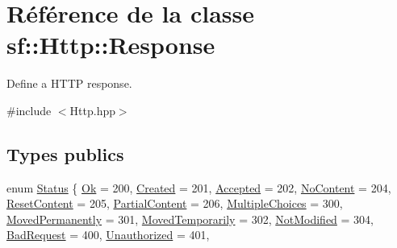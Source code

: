 \hypertarget{classsf_1_1Http_1_1Response}{}\section{Référence de la classe sf\+:\+:Http\+:\+:Response}
\label{classsf_1_1Http_1_1Response}


Define a H\+T\+TP response.  




{\ttfamily \#include $<$Http.\+hpp$>$}

\subsection*{Types publics}
\begin{DoxyCompactItemize}
\item 
enum \hyperlink{classsf_1_1Http_1_1Response_a663e071978e30fbbeb20ed045be874d8}{Status} \{ \newline
\hyperlink{classsf_1_1Http_1_1Response_a663e071978e30fbbeb20ed045be874d8a0158f932254d3f09647dd1f64bd43832}{Ok} = 200, 
\hyperlink{classsf_1_1Http_1_1Response_a663e071978e30fbbeb20ed045be874d8a0a6e8bafa9365a0ed10b8a9cbfd0649b}{Created} = 201, 
\hyperlink{classsf_1_1Http_1_1Response_a663e071978e30fbbeb20ed045be874d8ad328945457bd2f0d65107ba6b5ccd443}{Accepted} = 202, 
\hyperlink{classsf_1_1Http_1_1Response_a663e071978e30fbbeb20ed045be874d8aefde9e4abf5682dcd314d63143be42e0}{No\+Content} = 204, 
\newline
\hyperlink{classsf_1_1Http_1_1Response_a663e071978e30fbbeb20ed045be874d8a77327cc2a5e34cc64030b322e61d12a8}{Reset\+Content} = 205, 
\hyperlink{classsf_1_1Http_1_1Response_a663e071978e30fbbeb20ed045be874d8a0cfae3ab0469b73dfddc54312a5e6a8a}{Partial\+Content} = 206, 
\hyperlink{classsf_1_1Http_1_1Response_a663e071978e30fbbeb20ed045be874d8add95cbd8fa27516821f763488557f96b}{Multiple\+Choices} = 300, 
\hyperlink{classsf_1_1Http_1_1Response_a663e071978e30fbbeb20ed045be874d8a2f91651db3a09628faf68cbcefa0810a}{Moved\+Permanently} = 301, 
\newline
\hyperlink{classsf_1_1Http_1_1Response_a663e071978e30fbbeb20ed045be874d8a05c50d7b17c844e0b909e5802d5f1587}{Moved\+Temporarily} = 302, 
\hyperlink{classsf_1_1Http_1_1Response_a663e071978e30fbbeb20ed045be874d8a060ebc3af266e6bfe045b89e298e2545}{Not\+Modified} = 304, 
\hyperlink{classsf_1_1Http_1_1Response_a663e071978e30fbbeb20ed045be874d8a3f88a714cf5483ee22f9051e5a3c080a}{Bad\+Request} = 400, 
\hyperlink{classsf_1_1Http_1_1Response_a663e071978e30fbbeb20ed045be874d8ab7a79b7bff50fb1902c19eecbb4e2a2d}{Unauthorized} = 401, 

\end{DoxyCompactItemize}
